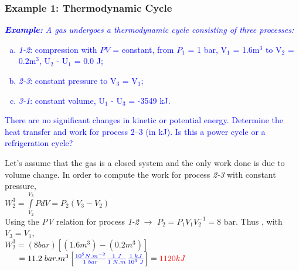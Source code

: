 \documentclass[10pt,compress,handout,ignorenonframetext]{beamer}
\begin{document}
\begin{frame}
 \frametitle{Example 1: Thermodynamic Cycle}
   \textcolor{blue}{{\it {\bf Example:} A gas undergoes a thermodynamic cycle consisting of three processes: 
   \begin{enumerate}[(a)]
    \item \textcolor{blue}{{\it 1-2}: compression with $PV$ = constant, from $P_{1}$ = 1 bar, V$_{1}$ = 1.6m$^{3}$ to V$_{2}$ = 0.2m$^{3}$, U$_{2}$ - U$_{1}$ = 0.0 J;}
    \item \textcolor{blue}{{\it 2-3}: constant pressure to V$_{3}$ = V$_{1}$;}
    \item \textcolor{blue}{{\it 3-1}: constant volume, U$_{1}$ - U$_{3}$ = -3549 kJ.}
   \end{enumerate}
   There are no significant changes in kinetic or potential energy. Determine the heat transfer and work for process 2–3 (in kJ). Is this a power cycle or a refrigeration cycle?}}

   Let's assume that the gas is a closed system and the only work done is due to volume change. In order to compute the work for process {\it 2-3} with constant pressure,\\
    $W_{2}^{3} = \int\limits_{V_{2}}^{V_{3}} P dV = P_{2}\left(V_{3}-V_{2}\right)$\\
   Using the {\it PV} relation for process {\it 1-2} $\rightarrow$ $P_{2}=P_{1}V_{1}V_{2}^{-1}=8\text{ bar}$. Thus , with $V_{3}=V_{1}$,\\
   $W_{2}^{3} = ( 8 bar ) \left[ \left( 1.6m^{3}\right) - \left( 0.2m^{3}\right) \right]$\\
   $\;\;\;\;\;\; = 11.2 \;bar.m^{3} \left[\textcolor{blue}{\frac{10^{5}N.m^{-2}}{1\; bar}\frac{1\; J}{1\; N.m}\frac{1\; kJ}{10^{3}\; J}}\right]= \textcolor{red}{1120 kJ}$
 \normalsize
\end{frame}
\end{document}

